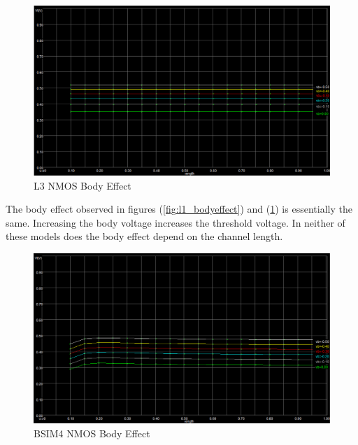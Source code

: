 \FloatBarrier

\FloatBarrier

\begin{figure}[h!]
	\centering
	\includegraphics[scale=0.50]{./images/level3_body_effect_nmos.PNG}
	\caption{L3 NMOS Body Effect}
	\label{fig:l3_bodyeffect}
\end{figure}

\FloatBarrier

The body effect observed in figures (\ref{fig:l1_bodyeffect}) and (\ref{fig:l3_bodyeffect}) is essentially the same.
Increasing the body voltage increases the threshold voltage.
In neither of these models does the body effect depend on the channel length.

\FloatBarrier

\begin{figure}[h!]
	\centering
	\includegraphics[scale=0.50]{./images/bsim4_body_effect_nmos.PNG}
	\caption{BSIM4 NMOS Body Effect}
	\label{fig:bsim4_bodyeffect}
\end{figure}

\FloatBarrier

